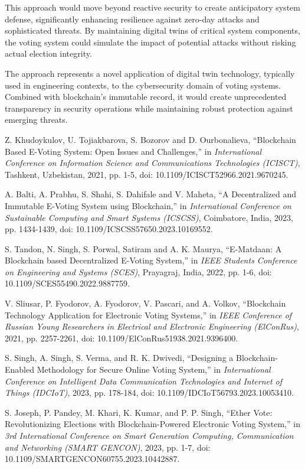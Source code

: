 \documentclass[conference]{IEEEtran}
\begin{document}
This approach would move beyond reactive security to create anticipatory system defense, significantly enhancing resilience against zero-day attacks and sophisticated threats. By maintaining digital twins of critical system components, the voting system could simulate the impact of potential attacks without risking actual election integrity.

The approach represents a novel application of digital twin technology, typically used in engineering contexts, to the cybersecurity domain of voting systems. Combined with blockchain's immutable record, it would create unprecedented transparency in security operations while maintaining robust protection against emerging threats.

\begin{thebibliography}{8}
Z. Khudoykulov, U. Tojiakbarova, S. Bozorov and D. Ourbonalieva, ``Blockchain Based E-Voting System: Open Issues and Challenges,'' in {\it International Conference on Information Science and Communications Technologies (ICISCT)}, Tashkent, Uzbekistan, 2021, pp. 1-5, doi: 10.1109/ICISCT52966.2021.9670245.

A. Balti, A. Prabhu, S. Shahi, S. Dahifale and V. Maheta, ``A Decentralized and Immutable E-Voting System using Blockchain,'' in {\it International Conference on Sustainable Computing and Smart Systems (ICSCSS)}, Coimbatore, India, 2023, pp. 1434-1439, doi: 10.1109/ICSCSS57650.2023.10169552.

S. Tandon, N. Singh, S. Porwal, Satiram and A. K. Maurya, ``E-Matdaan: A Blockchain based Decentralized E-Voting System,'' in {\it IEEE Students Conference on Engineering and Systems (SCES)}, Prayagraj, India, 2022, pp. 1-6, doi: 10.1109/SCES55490.2022.9887759.

V. Sliusar, P. Fyodorov, A. Fyodorov, V. Pascari, and A. Volkov, ``Blockchain Technology Application for Electronic Voting Systems,'' in {\it IEEE Conference of Russian Young Researchers in Electrical and Electronic Engineering (ElConRus)}, 2021, pp. 2257-2261, doi: 10.1109/ElConRus51938.2021.9396400.

S. Singh, A. Singh, S. Verma, and R. K. Dwivedi, ``Designing a Blockchain-Enabled Methodology for Secure Online Voting System,'' in {\it International Conference on Intelligent Data Communication Technologies and Internet of Things (IDCIoT)}, 2023, pp. 178-184, doi: 10.1109/IDCIoT56793.2023.10053410.

S. Joseph, P. Pandey, M. Khari, K. Kumar, and P. P. Singh, ``Ether Vote: Revolutionizing Elections with Blockchain-Powered Electronic Voting System,'' in {\it 3rd International Conference on Smart Generation Computing, Communication and Networking (SMART GENCON)}, 2023, pp. 1-7, doi: 10.1109/SMARTGENCON60755.2023.10442887.


\end{thebibliography}
\end{document}
